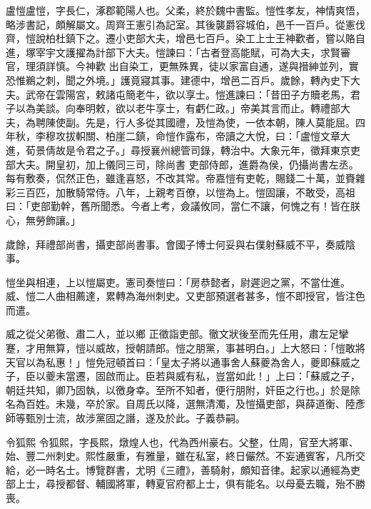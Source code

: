
\begin{pinyinscope}

 盧愷盧愷，字長仁，涿郡範陽人也。父柔，終於魏中書監。愷性孝友，神情爽悟，略涉書記，頗解屬文。周齊王憲引為記室。其後襲爵容城伯，邑千一百戶。從憲伐齊，愷說柏杜鎮下之。遷小吏部大夫，增邑七百戶。染工上士王神歡者，嘗以賂自進，塚宰宇文護擢為計部下大夫。愷諫曰：「古者登高能賦，可為大夫，求賢審官，理須詳慎。今神歡
 出自染工，更無殊異，徒以家富自通，遂與搢紳並列，實恐惟鵜之刺，聞之外境。」護竟寢其事。建德中，增邑二百戶。歲餘，轉內史下大夫。武帝在雲陽宮，敕諸屯簡老牛，欲以享士。愷進諫曰：「昔田子方贖老馬，君子以為美談。向奉明敕，欲以老牛享士，有虧仁政。」帝美其言而止。轉禮部大夫，為聘陳使副。先是，行人多從其國禮，及愷為使，一依本朝，陳人莫能屈。四年秋，李穆攻拔軹關、柏崖二鎮，命愷作露布，帝讀之大悅，曰：「盧愷文章大進，荀景倩故是令君之子。」尋授襄州總管司錄，轉治中。大象元年，徵拜東京吏部大夫。開皇初，加上儀同三司，除尚書
 吏部侍郎，進爵為侯，仍攝尚書左丞。每有敷奏，侃然正色，雖逢喜怒，不改其常。帝嘉愷有吏乾，賜錢二十萬，並賚雜彩三百匹，加散騎常侍。八年，上親考百僚，以愷為上。愷固讓，不敢受，高祖曰：「吏部勤幹，舊所聞悉。今者上考，僉議攸同，當仁不讓，何愧之有！皆在朕心，無勞飾讓。」



 歲餘，拜禮部尚書，攝吏部尚書事。會國子博士何妥與右僕射蘇威不平，奏威陰事。



 愷坐與相連，上以愷屬吏。憲司奏愷曰：「房恭懿者，尉遲迥之黨，不當仕進。威、愷二人曲相薦達，累轉為海州刺史。又吏部預選者甚多，愷不即授官，皆注色而遣。



 威之從父弟徹、肅二人，並以鄉
 正徵詣吏部。徹文狀後至而先任用，肅左足攣蹇，才用無算，愷以威故，授朝請郎。愷之朋黨，事甚明白。」上大怒曰：「愷敢將天官以為私惠！」愷免冠頓首曰：「皇太子將以通事舍人蘇夔為舍人，夔即蘇威之子，臣以夔未當遷，固啟而止。臣若與威有私，豈當如此！」上曰：「蘇威之子，朝廷共知，卿乃固執，以徼身幸。至所不知者，便行朋附，奸臣之行也。」於是除名為百姓。未幾，卒於家。自周氏以降，選無清濁，及愷攝吏部，與薛道衡、陸彥師等甄別士流，故涉黨固之譖，遂及於此。子義恭嗣。



 令狐熙
 令狐熙，字長熙，燉煌人也，代為西州豪右。父整，仕周，官至大將軍、始、豐二州刺史。熙性嚴重，有雅量，雖在私室，終日儼然。不妄通賓客，凡所交給，必一時名士。博覽群書，尤明《三禮》，善騎射，頗知音律。起家以通經為吏部上士，尋授都督、輔國將軍，轉夏官府都上士，俱有能名。以母憂去職，殆不勝喪。




\end{pinyinscope}
